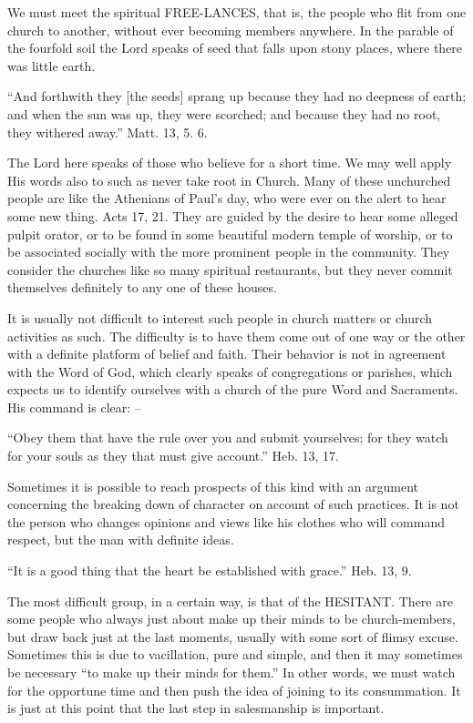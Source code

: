 \documentclass[
]{book}
\begin{document}
We must meet the spiritual FREE-LANCES, that is, the people who flit from one church to another, without ever becoming members anywhere. In the parable of the fourfold soil the Lord speaks of seed that falls upon stony places, where there was little earth.

``And forthwith they {[}the seeds{]} sprang up because they had no deepness of earth; and when the sun was up, they were scorched; and because they had no root, they withered away.'' Matt. 13, 5. 6.

The Lord here speaks of those who believe for a short time. We may well apply His words also to such as never take root in Church. Many of these unchurched people are like the Athenians of Paul's day, who were ever on the alert to hear some new thing. Acts 17, 21. They are guided by the desire to hear some alleged pulpit orator, or to be found in some beautiful modern temple of worship, or to be associated socially with the more prominent people in the community. They consider the churches like so many spiritual restaurants, but they never commit themselves definitely to any one of these houses.

It is usually not difficult to interest such people in church matters or church activities as such. The difficulty is to have them come out of one way or the other with a definite platform of belief and faith. Their behavior is not in agreement with the Word of God, which clearly speaks of congregations or parishes, which expects us to identify ourselves with a church of the pure Word and Sacraments. His command is clear: --

``Obey them that have the rule over you and submit yourselves; for they watch for your souls as they that must give account.'' Heb. 13, 17.

Sometimes it is possible to reach prospects of this kind with an argument concerning the breaking down of character on account of such practices. It is not the person who changes opinions and views like his clothes who will command respect, but the man with definite ideas.

``It is a good thing that the heart be established with grace.'' Heb. 13, 9.

The most difficult group, in a certain way, is that of the HESITANT. There are some people who always just about make up their minds to be church-members, but draw back just at the last moments, usually with some sort of flimsy excuse. Sometimes this is due to vacillation, pure and simple, and then it may sometimes be necessary ``to make up their minds for them.'' In other words, we must watch for the opportune time and then push the idea of joining to its consummation. It is just at this point that the last step in salesmanship is important.
\end{document}
